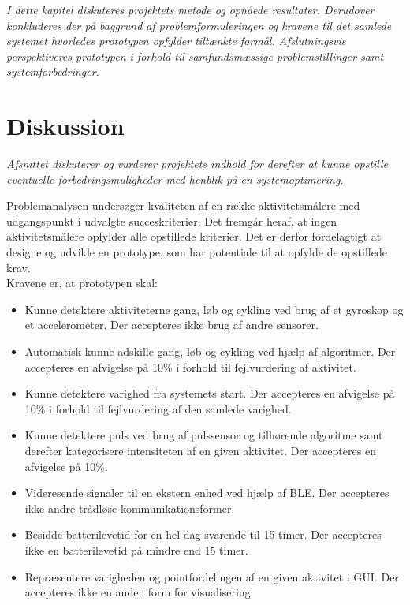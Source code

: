 \textit{I dette kapitel diskuteres projektets metode og opnåede resultater. Derudover konkluderes der på baggrund af problemformuleringen og kravene til det samlede systemet hvorledes prototypen opfylder tiltænkte formål. Afslutningsvis perspektiveres prototypen i forhold til samfundsmæssige problemstillinger samt systemforbedringer.}

\section{Diskussion}\label{sec:diskussion}
\textit{Afsnittet diskuterer og vurderer projektets indhold for derefter at kunne opstille eventuelle forbedringsmuligheder med henblik på en systemoptimering.}

Problemanalysen undersøger kvaliteten af en række aktivitetsmålere med udgangspunkt i udvalgte succeskriterier. Det fremgår heraf, at ingen aktivitetsmålere opfylder alle opstillede kriterier. Det er derfor fordelagtigt at designe og udvikle en prototype, som har potentiale til at opfylde de opstillede krav. \\
Kravene er, at prototypen skal:
\begin{itemize}
	\item Kunne detektere aktiviteterne gang, løb og cykling ved brug af et gyroskop og et accelerometer. Der accepteres ikke brug af andre sensorer.
	\item Automatisk kunne adskille gang, løb og cykling ved hjælp af algoritmer. Der accepteres en afvigelse på 10\% i forhold til fejlvurdering af aktivitet.
	\item Kunne detektere varighed fra systemets start. Der accepteres en afvigelse på 10\% i forhold til fejlvurdering af den samlede varighed.	
	\item Kunne detektere puls ved brug af pulssensor og tilhørende algoritme samt derefter kategorisere intensiteten af en given aktivitet. Der accepteres en afvigelse på 10\%.
	\item Videresende signaler til en ekstern enhed ved hjælp af BLE. Der accepteres ikke andre trådløse kommunikationsformer.
	\item Besidde batterilevetid for en hel dag svarende til 15 timer. Der accepteres ikke en batterilevetid på mindre end 15 timer.
	\item Repræsentere varigheden og pointfordelingen af en given aktivitet i GUI. Der accepteres ikke en anden form for visualisering.	
\end{itemize}

